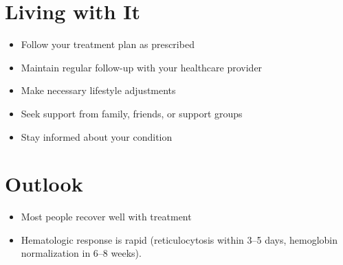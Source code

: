 \section{Living with It}
\begin{itemize}[noitemsep]
  \item Follow your treatment plan as prescribed
  \item Maintain regular follow-up with your healthcare provider
  \item Make necessary lifestyle adjustments
  \item Seek support from family, friends, or support groups
  \item Stay informed about your condition
\end{itemize}
\section{Outlook}
\begin{itemize}[noitemsep]
  \item Most people recover well with treatment
  \item Hematologic response is rapid (reticulocytosis within 3--5 days, hemoglobin normalization in 6--8 weeks).
\end{itemize}
